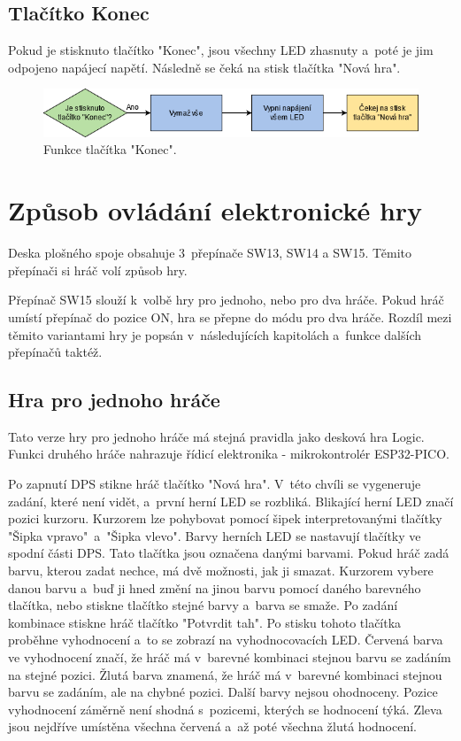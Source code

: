   \section{Tlačítko Konec}
  Pokud je stisknuto tlačítko "Konec", jsou všechny LED zhasnuty a~poté je jim odpojeno napájecí napětí. Následně se čeká na stisk tlačítka
  "Nová hra". 

  \begin{figure}[!h]
    \begin{center}
      \includegraphics[scale=0.6]{obrazky/Konec.png}
    \end{center}
    \caption[Funkce tlačítka Konec]{Funkce tlačítka "Konec".}
  \end{figure}

\chapter{Způsob ovládání elektronické hry}
Deska plošného spoje obsahuje 3~přepínače SW13, SW14 a SW15. Těmito přepínači si hráč volí způsob hry.

Přepínač SW15 slouží k~volbě hry pro jednoho, nebo pro dva hráče. Pokud hráč umístí přepínač do pozice ON, hra se přepne
do módu pro dva hráče. Rozdíl mezi těmito variantami hry je popsán v~následujících kapitolách a~funkce dalších přepínačů taktéž.

\section{Hra pro jednoho hráče}
Tato verze hry pro jednoho hráče má stejná pravidla jako desková hra Logic. Funkci druhého hráče nahrazuje řídicí elektronika
- mikrokontrolér ESP32-PICO.

Po zapnutí DPS stikne hráč tlačítko "Nová hra". V~této chvíli se vygeneruje zadání, které není vidět, a~první herní LED se 
rozbliká. Blikající herní LED značí pozici kurzoru. 
Kurzorem lze pohybovat pomocí šipek interpretovanými tlačítky "Šipka vpravo"\  a~"Šipka vlevo". Barvy herních LED se nastavují 
tlačítky ve spodní části DPS. Tato tlačítka jsou označena danými barvami. Pokud hráč zadá barvu, kterou zadat nechce, má dvě možnosti,
jak ji smazat. Kurzorem vybere danou barvu a~buď ji hned změní na jinou barvu pomocí daného barevného tlačítka, nebo stiskne tlačítko 
stejné barvy a~barva se smaže. 
Po zadání kombinace stiskne hráč tlačítko "Potvrdit tah". Po stisku tohoto tlačítka proběhne vyhodnocení a~to se zobrazí na 
vyhodnocovacích LED. 
Červená barva ve vyhodnocení značí, že hráč má v~barevné kombinaci stejnou barvu se zadáním na stejné pozici. Žlutá barva znamená,
že hráč má v~barevné kombinaci stejnou barvu se zadáním, ale na chybné pozici. Další barvy nejsou ohodnoceny. Pozice vyhodnocení
záměrně není shodná s~pozicemi, kterých se hodnocení týká. Zleva jsou nejdříve umístěna všechna červená a~až poté všechna žlutá 
hodnocení.

